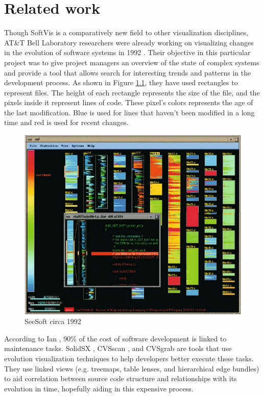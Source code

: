 \chapter{Related work} \label{sec:related}
Though SoftVis is a comparatively new field to other visualization disciplines, AT\&T Bell Laboratory researchers were already working on visualizing changes in the evolution of software systems in 1992 \cite{seesoft}. Their objective in this particular project was to give project managers an overview of the state of complex systems and provide a tool that allows search for interesting trends and patterns in the development process. As shown in Figure \ref{fig:seesoft}, they have used rectangles to represent files. The height of each rectangle represents the size of the file, and the pixels inside it represent lines of code. These pixel's colors represents the age of the last modification. Blue is used for lines that haven't been modified in a long time and red is used for recent changes.

\begin{figure}[H]
	\centering
	\includegraphics[width=1.0\textwidth]{figures/seesoft.png}
	\caption{SeeSoft circa 1992}
	\label{fig:seesoft}
\end{figure}

According to Ian \citet{Sommerville:2004:SE:983346}, 90\% of the cost of software development is linked to maintenance tasks. SolidSX \cite{ref:solid}, CVSscan \cite{voinea2005}, and CVSgrab \cite{VisSym:EuroVis06:187-194} are tools that use evolution visualization techniques to help developers better execute these tasks. They use linked views (e.g. treemaps, table lenses, and hierarchical edge bundles) to aid correlation between source code structure and relationships with its evolution in time, hopefully aiding in this expensive process.

